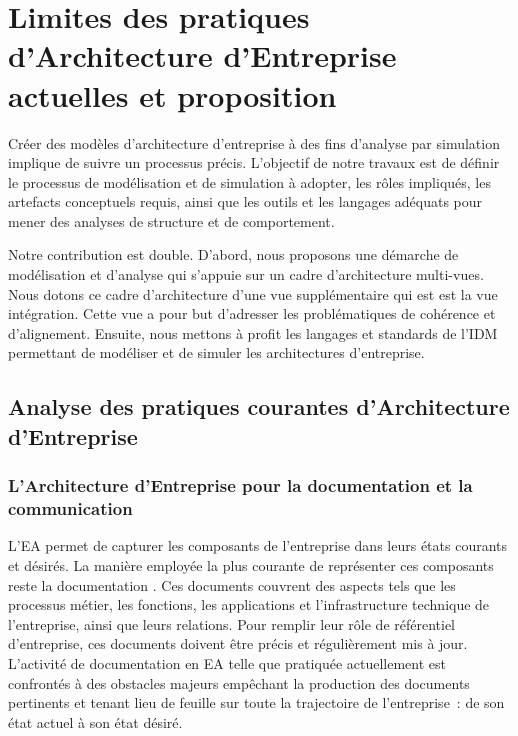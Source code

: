 \chapter{Limites des pratiques d'Architecture d'Entreprise actuelles et proposition}
\label{ch:demarche}

\PartialToc

Créer des modèles d'architecture d'entreprise à des fins d'analyse par simulation implique de suivre un processus précis. L'objectif de notre travaux est de définir le processus de modélisation et de simulation à adopter, les rôles impliqués, les artefacts conceptuels requis, ainsi que les outils et les langages adéquats pour mener des analyses de structure et de comportement. 

Notre contribution est double. D'abord, nous proposons une démarche de modélisation et d'analyse qui s'appuie sur un cadre d'architecture multi-vues. Nous dotons ce cadre d'architecture d'une vue supplémentaire qui est est la vue intégration. Cette vue a pour but d'adresser les problématiques de cohérence et d'alignement. Ensuite, nous mettons à profit les langages et standards de l'IDM permettant de modéliser et de simuler les architectures d'entreprise. 



\section{Analyse des pratiques courantes d'Architecture d'Entreprise}

	\subsection{L'Architecture d'Entreprise pour la documentation et la communication}
	L'EA permet de capturer les composants de l'entreprise dans leurs états courants et désirés. La manière employée la plus courante de représenter ces composants reste la documentation \cite{barn2013enterprise}. Ces documents couvrent des aspects tels que les processus métier, les fonctions, les applications et l'infrastructure technique de l'entreprise, ainsi que leurs relations. Pour remplir leur rôle de référentiel d'entreprise, ces documents doivent être précis et régulièrement mis à jour. L'activité de documentation en EA telle que pratiquée actuellement est confrontés à des obstacles majeurs empêchant la production des documents pertinents et tenant lieu de feuille sur toute la trajectoire de l'entreprise~: de son état actuel à son état désiré.
	
